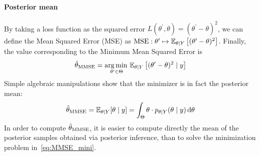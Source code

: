 \documentclass[../../Main_ManuscritThese.tex]{subfiles}
\begin{document}
\paragraph{Posterior mean}
By taking a loss function as the squared error $L(\theta^{\prime}, \theta) = (\theta^{\prime} - \theta)^2$, we can define the Mean Squared Error (MSE) as $\mathrm{MSE}: \theta^{\prime}\mapsto\mathbb{E}_{\theta\mid Y}\left[(\theta^{\prime} - \theta)^2\right]$. Finally, the value corresponding to the Minimum Mean Squared Error is
\begin{equation}
  \label{eq:MMSE_mini}
  \hat{\theta}_{\mathrm{MMSE}} = \operatorname*{arg\,min \,}_{\theta^{\prime}\in\Theta}\mathbb{E}_{\theta\mid Y}\left[(\theta^{\prime} - \theta)^2 \mid  y\right]
\end{equation}
Simple algebraic manipulations show that the minimizer is in fact the posterior mean:
\begin{equation}
  \label{eq:def_MMSE}
  \hat{\theta}_{\mathrm{MMSE}} = \mathbb{E}_{\theta\mid Y}[\theta \mid  y] = \int_{\Theta}\theta\cdot p_{\theta\mid Y}(\theta \mid  y)\,\mathrm{d}\theta
\end{equation}
In order to compute $\hat{\theta}_{\mathrm{MMSE}}$, it is easier to compute directly the mean of the posterior samples obtained via posterior inference, than to solve the minimization problem in~\cref{eq:MMSE_mini}.
\end{document}
